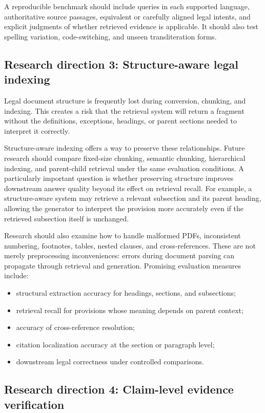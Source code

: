 A reproducible benchmark should include queries in each supported language, authoritative source passages,
equivalent or carefully aligned legal intents, and explicit judgments of whether retrieved evidence is
applicable. It should also test spelling variation, code-switching, and unseen transliteration forms.

\subsection{Research direction 3: Structure-aware legal indexing}

Legal document structure is frequently lost during conversion, chunking, and indexing. This creates a
risk that the retrieval system will return a fragment without the definitions, exceptions, headings, or
parent sections needed to interpret it correctly.

Structure-aware indexing offers a way to preserve these relationships. Future research should compare
fixed-size chunking, semantic chunking, hierarchical indexing, and parent-child retrieval under the same
evaluation conditions. A particularly important question is whether preserving structure improves
downstream answer quality beyond its effect on retrieval recall. For example, a structure-aware system
may retrieve a relevant subsection and its parent heading, allowing the generator to interpret the
provision more accurately even if the retrieved subsection itself is unchanged.

Research should also examine how to handle malformed PDFs, inconsistent numbering, footnotes, tables,
nested clauses, and cross-references. These are not merely preprocessing inconveniences: errors during
document parsing can propagate through retrieval and generation. Promising evaluation measures include:
\begin{itemize}[leftmargin=1.4em, itemsep=2pt, topsep=2pt]
\item structural extraction accuracy for headings, sections, and subsections;
\item retrieval recall for provisions whose meaning depends on parent context;
\item accuracy of cross-reference resolution;
\item citation localization accuracy at the section or paragraph level;
\item downstream legal correctness under controlled comparisons.
\end{itemize}

\subsection{Research direction 4: Claim-level evidence verification}

